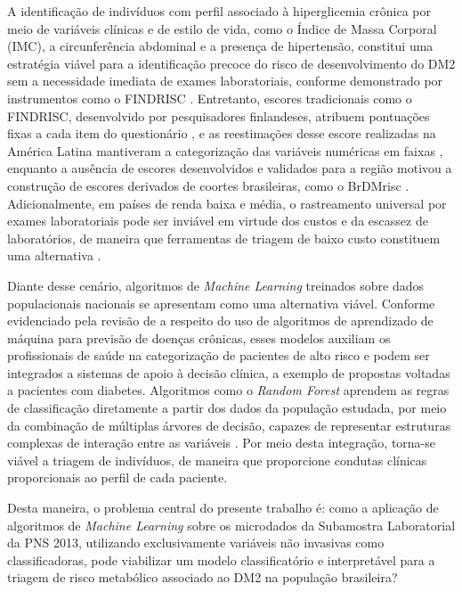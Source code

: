 A identificação de indivíduos com perfil associado à hiperglicemia crônica por meio de variáveis clínicas e de estilo de vida, como o Índice de Massa Corporal (IMC), a circunferência abdominal e a presença de hipertensão, constitui uma estratégia viável para a identificação precoce do risco de desenvolvimento do DM2 sem a necessidade imediata de exames laboratoriais, conforme demonstrado por instrumentos como o FINDRISC \cite{conceiccao2020translation}. Entretanto, escores tradicionais como o FINDRISC, desenvolvido por pesquisadores finlandeses, atribuem pontuações fixas a cada item do questionário \cite{conceiccao2020translation}, e as reestimações desse escore realizadas na América Latina mantiveram a categorização das variáveis numéricas em faixas \cite{CarrilloLarco2020}, enquanto a ausência de escores desenvolvidos e validados para a região motivou a construção de escores derivados de coortes brasileiras, como o BrDMrisc \cite{bracco2026brdmrisc}. Adicionalmente, em países de renda baixa e média, o rastreamento universal por exames laboratoriais pode ser inviável em virtude dos custos e da escassez de laboratórios, de maneira que ferramentas de triagem de baixo custo constituem uma alternativa \cite{CarrilloLarco2020}.

Diante desse cenário, algoritmos de \textit{Machine Learning} treinados sobre dados populacionais nacionais se apresentam como uma alternativa viável. Conforme evidenciado pela revisão de \textcite{islam2024comprehensive} a respeito do uso de algoritmos de aprendizado de máquina para previsão de doenças crônicas, esses modelos auxiliam os profissionais de saúde na categorização de pacientes de alto risco e podem ser integrados a sistemas de apoio à decisão clínica, a exemplo de propostas voltadas a pacientes com diabetes. Algoritmos como o \textit{Random Forest} aprendem as regras de classificação diretamente a partir dos dados da população estudada, por meio da combinação de múltiplas árvores de decisão, capazes de representar estruturas complexas de interação entre as variáveis \cite{hastie2009elements}. Por meio desta integração, torna-se viável a triagem de indivíduos, de maneira que proporcione condutas clínicas proporcionais ao perfil de cada paciente.

Desta maneira, o problema central do presente trabalho é: como a aplicação de algoritmos de \textit{Machine Learning} sobre os microdados da Subamostra Laboratorial da PNS 2013, utilizando exclusivamente variáveis não invasivas como classificadoras, pode viabilizar um modelo classificatório e interpretável para a triagem de risco metabólico associado ao DM2 na população brasileira?

